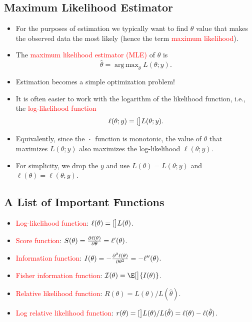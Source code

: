 \documentclass{article}\usepackage[]{graphicx}\usepackage[svgnames]{xcolor}
\let\log\relax%
\DeclareMathOperator*{\argmax}{arg\,max}
\begin{document}
\subsection*{Maximum Likelihood Estimator}
\begin{itemize}
      \item For the purposes of estimation we typically want to find $ \theta $ value that makes the
            observed data the most likely (hence the term \textcolor{Red}{maximum likelihood}).
      \item The \textcolor{Red}{maximum likelihood estimator (MLE)} of $ \theta $ is
            \[ \hat{\theta}=\argmax_\theta L(\theta;y). \]
      \item Estimation becomes a simple optimization problem!
      \item It is often easier to work with the logarithm of the likelihood function, i.e., the
            \textcolor{Red}{log-likelihood function}
            \[ \ell(\theta;y)=\log[\big]{L(\theta;y)}. \]
      \item Equivalently, since the $ \log{\:\cdot\:} $ function is monotonic, the value of $ \theta $ that maximizes $ L(\theta;y) $ also
            maximizes the log-likelihood $ \ell(\theta;y) $.
      \item For simplicity, we drop the $ y $ and use $ L(\theta)=L(\theta;y) $ and $ \ell(\theta)=\ell(\theta;y) $.
\end{itemize}

\subsection*{A List of Important Functions}
\begin{itemize}
      \item \textcolor{Red}{Log-likelihood function}: $ \ell(\theta)=\log[\big]{L(\theta)} $.
      \item \textcolor{Red}{Score function}: $ S(\theta)=\pdv{\ell(\theta)}{\theta}=\ell^\prime(\theta)$.
      \item \textcolor{Red}{Information function}: $ I(\theta)=-\pdv[order=2]{\ell(\theta)}{\theta}=-\ell^{\prime\prime}(\theta) $.
      \item \textcolor{Red}{Fisher information function}: $ \mathcal{I}(\theta)=\E[\big]{I(\theta)} $.
      \item \textcolor{Red}{Relative likelihood function}: $ R(\theta)=L(\theta)/L(\hat{\theta}) $.
      \item \textcolor{Red}{Log relative likelihood function}: $ r(\theta)=\log[\big]{L(\theta)/L(\hat{\theta})}=\ell(\theta)-\ell(\hat{\theta}) $.
\end{itemize}
\end{document}
